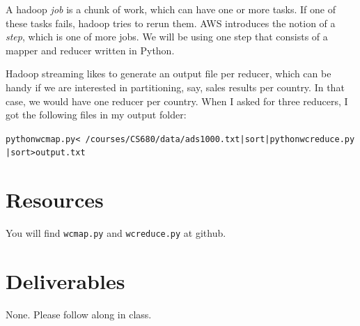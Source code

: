 \begin{fullwidth}
A hadoop {\em job} is a chunk of work, which can have one or more tasks. If one of these tasks fails, hadoop tries to rerun them. AWS introduces the notion of a {\em step}, which is one of more jobs. We will be using one step that consists of a mapper and reducer written in Python.

Hadoop streaming likes to generate an output file per reducer, which can be handy if we are interested in partitioning, say, sales results per country. In that case, we would have one reducer per country.  When I asked for three reducers, I got the following files in my output folder:



\begin{alltt}\small
python wcmap.py < ~/courses/CS680/data/ads1000.txt |sort| python wcreduce.py | sort > output.txt
\end{alltt}

\section{Resources}

You will find {\tt wcmap.py} and {\tt wcreduce.py} at github.

\section{Deliverables}

None. Please follow along in class.

\end{fullwidth}
